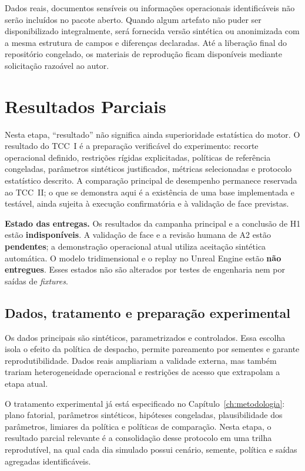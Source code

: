 \documentclass[
  12pt,
  oneside,
  a4paper,
  sumario=tradicional,
  brazil
]{abntex2}
\begin{document}
Dados reais, documentos sens\'iveis ou informa\c{c}\~oes operacionais identific\'aveis n\~ao ser\~ao inclu\'idos no pacote aberto. Quando algum artefato n\~ao puder ser disponibilizado integralmente, ser\'a fornecida vers\~ao sint\'etica ou anonimizada com a mesma estrutura de campos e diferen\c{c}as declaradas. At\'e a libera\c{c}\~ao final do reposit\'orio congelado, os materiais de reprodu\c{c}\~ao ficam dispon\'iveis mediante solicita\c{c}\~ao razo\'avel ao autor.

\chapter{Resultados Parciais}

Nesta etapa, ``resultado'' n\~ao significa ainda superioridade estat\'istica do motor. O resultado do TCC~I \'e a prepara\c{c}\~ao verific\'avel do experimento: recorte operacional definido, restri\c{c}\~oes r\'igidas explicitadas, pol\'iticas de refer\^encia congeladas, par\^ametros sint\'eticos justificados, m\'etricas selecionadas e protocolo estat\'istico descrito. A compara\c{c}\~ao principal de desempenho permanece reservada ao TCC~II; o que se demonstra aqui \'e a exist\^encia de uma base implementada e test\'avel, ainda sujeita \`a execu\c{c}\~ao confirmat\'oria e \`a valida\c{c}\~ao de face previstas.

\noindent\textbf{Estado das entregas.} Os resultados da campanha principal e a conclus\~ao de H1 est\~ao \textbf{indispon\'iveis}. A valida\c{c}\~ao de face e a revis\~ao humana de A2 est\~ao \textbf{pendentes}; a demonstra\c{c}\~ao operacional atual utiliza aceita\c{c}\~ao sint\'etica autom\'atica. O modelo tridimensional e o replay no Unreal Engine est\~ao \textbf{n\~ao entregues}. Esses estados n\~ao s\~ao alterados por testes de engenharia nem por sa\'idas de \textit{fixtures}.

\section{Dados, tratamento e preparação experimental}

Os dados principais s\~ao sint\'eticos, parametrizados e controlados. Essa escolha isola o efeito da pol\'itica de despacho, permite pareamento por sementes e garante reprodutibilidade. Dados reais ampliariam a validade externa, mas tamb\'em trariam heterogeneidade operacional e restri\c{c}\~oes de acesso que extrapolam a etapa atual.

O tratamento experimental j\'a est\'a especificado no Cap\'itulo~\ref{ch:metodologia}: plano fatorial, par\^ametros sint\'eticos, hip\'oteses congeladas, plausibilidade dos par\^ametros, limiares da pol\'itica e pol\'iticas de compara\c{c}\~ao. Nesta etapa, o resultado parcial relevante \'e a consolida\c{c}\~ao desse protocolo em uma trilha reprodut\'ivel, na qual cada dia simulado possui cen\'ario, semente, pol\'itica e sa\'idas agregadas identific\'aveis.
\end{document}
